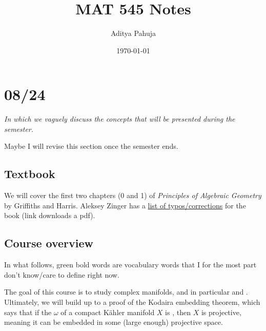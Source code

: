 \documentclass[10pt]{article}
\title{MAT 545 Notes}
\author{Aditya Pahuja}
\date{\today}
\begin{document}
\maketitle
\tableofcontents
\pagebreak

\section{08/24}

\emph{In which we vaguely discuss the concepts that will be presented
during the semester.}


{\scriptsize Maybe I will revise this section once the semester ends.}

\subsection{Textbook}

We will cover the first two chapters (0 and 1) of
\emph{Principles of Algebraic Geometry} by Griffiths and Harris.
Aleksey Zinger has a
\href{https://www.math.stonybrook.edu/~azinger/mat545-fall19/GHnotes.pdf}{list of typos/corrections}
for the book (link downloads a pdf).

\subsection{Course overview}

In what follows, green bold words are vocabulary words
that I for the most part don't know/care to define right now.

The goal of this course is to study complex manifolds,
and in particular  and .
Ultimately, we will build up to a proof of the
\alert{Kodaira embedding theorem}, which says that
if the  $\omega$ of a compact K\"ahler manifold $X$
is , then $X$ is projective, meaning
it can be embedded in some (large enough) projective space.
\end{document}
